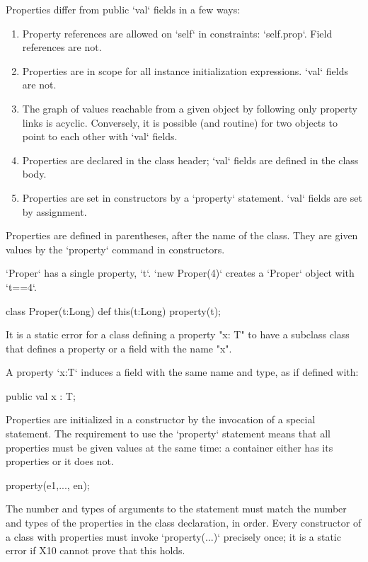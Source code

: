Properties differ from public \xcd`val` fields in a few ways: 
\begin{enumerate}
\item Property references are allowed on \xcd`self` in constraints:
      \xcd`self.prop`.  Field references are not.
\item Properties are in scope for all instance initialization expressions.
      \xcd`val` fields are not.
\item The graph of values reachable from a given object by following only
      property links is acyclic.  Conversely, it is possible (and routine) for
      two objects to point to each other with \xcd`val` fields.
\item Properties are declared in the class header; \xcd`val` fields are
      defined in the class body.
\item Properties are set in constructors by a \xcd`property` statement.
      \xcd`val` fields are set by assignment.
\end{enumerate}



Properties are defined in parentheses, after the name of the class.  They are
given values by the \xcd`property` command in constructors.

\begin{ex}
\xcd`Proper` has a single property, \xcd`t`.  \xcd`new Proper(4)` creates a
\xcd`Proper` object with \xcd`t==4`. 
\begin{xten}
class Proper(t:Long) {
  def this(t:Long) {property(t);}
}
\end{xten}

\end{ex}


It is a static error for a class
defining a property \xcd"x: T" to have a subclass class that defines
a property or a field with the name \xcd"x".


A property \xcd`x:T` induces a field with the same name and type, 
as if defined with: 
\begin{xten}
public val x : T;
\end{xten} 

Properties are initialized in a constructor by the invocation of a special 
statement. The requirement to use the \xcd`property` statement means that all properties
must be given values at the same time: a container either has its properties
or it does not.
\begin{xten}
property(e1,..., en);
\end{xten}
The number and types of arguments to the  statement must match
the number and types of the properties in the class declaration, in order.  
Every constructor of a class with properties must invoke \xcd`property(...)`
precisely once; it is a static error if X10 cannot prove that this holds.



